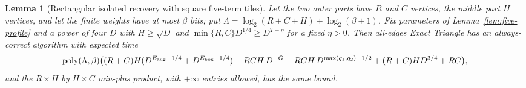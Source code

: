 \documentclass[11pt]{article}
\newtheorem{lemma}[theorem]{Lemma}
\begin{document}
\begin{lemma}[Rectangular isolated recovery with square five-term tiles]
\label{lem:five-rect-isolation}
Let the two outer parts have $R$ and $C$ vertices, the middle part $H$
vertices, and let the finite weights have at most $\beta$ bits; put
$\Lambda=\log_2(R+C+H)+\log_2(\beta+1)$. Fix parameters of
Lemma~\ref{lem:five-profile} and a power of four $D$ with $H\ge\sqrt D$
and $\min\{R,C\}D^{1/4}\ge D^{T+\eta}$ for a fixed $\eta>0$. Then
all-edges Exact Triangle has an always-correct algorithm with expected time
\[
 \operatorname{poly}(\Lambda,\beta)\bigl((R+C)H(D^{E_{\rm aug}-1/4}
 +D^{E_{\rm box}-1/4})+RCH\,D^{-G}+RCH\,D^{\max(q_1,q_2)-1/2}
 +(R+C)HD^{3/4}+RC\bigr),
\]
and the $R\times H$ by $H\times C$ min-plus product, with $+\infty$
entries allowed, has the same bound.
\end{lemma}
\end{document}
